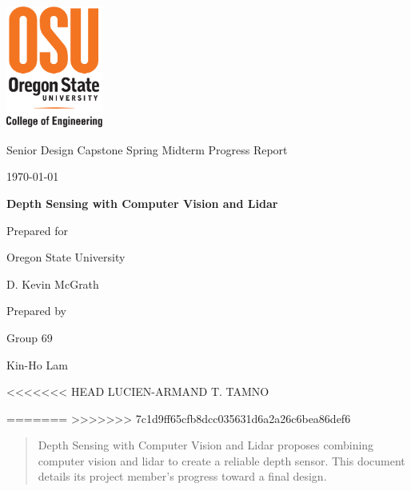\documentclass[onecolumn, draftclsnofoot,10pt, compsoc]{IEEEtran}
\def \CapstoneTeamName{			}
\def \CapstoneTeamNumber{		69}
\def \GroupMemberOne{			Kin-Ho Lam}
\def \GroupMemberTwo{LUCIEN-ARMAND T. TAMNO}
\def \CapstoneProjectName{		Depth Sensing with Computer Vision and Lidar}
\def \CapstoneSponsorCompany{	Oregon State University}
\def \CapstoneSponsorPerson{	D. Kevin McGrath}
\def \DocType{
	Spring Midterm Progress Report
}
\newcommand{\NameSigPair}[1]{\par
	\makebox[2.75in][r]{#1} \hfil 	\makebox[3.25in]{\makebox[2.25in]{\hrulefill} \hfill		\makebox[.75in]{\hrulefill}}
	\par\vspace{-12pt} \textit{\tiny\noindent
		\makebox[2.75in]{} \hfil		\makebox[3.25in]{\makebox[2.25in][r]{Signature} \hfill	\makebox[.75in][r]{Date}}}}
\renewcommand{\NameSigPair}[1]{#1}
\begin{document}
	\begin{titlepage}
		\begin{singlespace}
			\centering
			\includegraphics[height=4cm,natwidth=345,natheight=435]{images/osu_logo.png}
			\hfill 
			\par\vspace{.2in}
			\centering
			\scshape{
				\huge Senior Design Capstone \DocType \par
				{\large\today}\par
				\vspace{.5in}
				\textbf{\Huge\CapstoneProjectName}\par
				\vfill
				{\large Prepared for}\par
				\Huge \CapstoneSponsorCompany\par
				\vspace{5pt}
				{\Large\NameSigPair{\CapstoneSponsorPerson}\par}
				{\large Prepared by }\par
				Group\CapstoneTeamNumber\par
				\CapstoneTeamName\par 
				\vspace{5pt}
				{\large
					\NameSigPair{\GroupMemberOne}\par
<<<<<<< HEAD
					\NameSigPair{\GroupMemberTwo}\par
=======
>>>>>>> 7c1d9ff65cfb8dcc035631d6a2a26c6bea86def6
				}
				\vspace{20pt}
			}
			\begin{abstract}  
 				Depth Sensing with Computer Vision and Lidar proposes combining computer vision and lidar to create a reliable depth sensor.
				This document details its project member's progress toward a final design.
			\end{abstract}     
		\end{singlespace}
	\end{titlepage}
\end{document}
